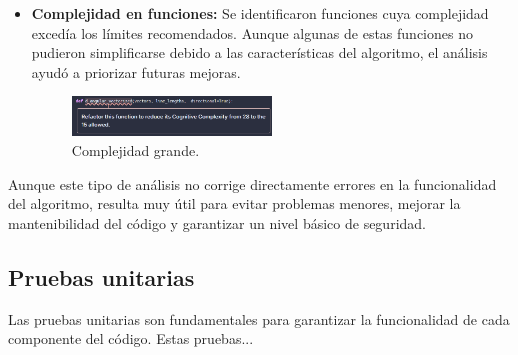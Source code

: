 \begin{itemize}
    \item \textbf{Complejidad en funciones:} Se identificaron funciones cuya complejidad excedía los límites recomendados. Aunque algunas de estas funciones no pudieron simplificarse debido a las características del algoritmo, el análisis ayudó a priorizar futuras mejoras.
    
\begin{figure}[h!]
    \centering
    \includegraphics[width=0.5\textwidth]{img/sonarq_complex.png}
    \caption{Complejidad grande.}
    \label{fig:trayectorias_Spectral}
\end{figure}

\end{itemize}

Aunque este tipo de análisis no corrige directamente errores en la funcionalidad del algoritmo, resulta muy útil para evitar problemas menores, mejorar la mantenibilidad del código y garantizar un nivel básico de seguridad.

\subsection{Pruebas unitarias}

Las pruebas unitarias son fundamentales para garantizar la funcionalidad de cada componente del código. Estas pruebas...



